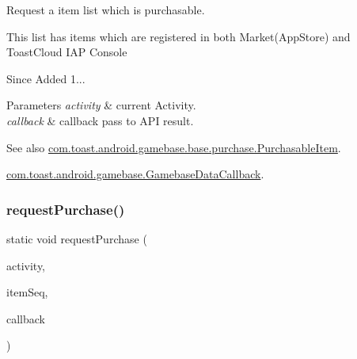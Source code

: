 Request a item list which is purchasable. 

This list has items which are registered in both Market(\+App\+Store) and Toast\+Cloud I\+AP Console

\begin{DoxySince}{Since}
Added 1... 
\end{DoxySince}

\begin{DoxyParams}{Parameters}
{\em activity} & current Activity. \\
\hline
{\em callback} & callback pass to A\+PI result. \\
\hline
\end{DoxyParams}
\begin{DoxySeeAlso}{See also}
\hyperlink{classcom_1_1toast_1_1android_1_1gamebase_1_1base_1_1purchase_1_1_purchasable_item}{com.\+toast.\+android.\+gamebase.\+base.\+purchase.\+Purchasable\+Item}. 

\hyperlink{interfacecom_1_1toast_1_1android_1_1gamebase_1_1_gamebase_data_callback}{com.\+toast.\+android.\+gamebase.\+Gamebase\+Data\+Callback}. 
\end{DoxySeeAlso}
\mbox{\label{classcom_1_1toast_1_1android_1_1gamebase_1_1_gamebase_1_1_purchase_a046768008c4f0d0eb8f6c5052f621b87}} 
\subsubsection{\texorpdfstring{request\+Purchase()}{requestPurchase()}}
{\footnotesize\ttfamily static void request\+Purchase (\begin{DoxyParamCaption}\item[{@Non\+Null final Activity}]{activity,  }\item[{final long}]{item\+Seq,  }\item[{@Non\+Null final \hyperlink{interfacecom_1_1toast_1_1android_1_1gamebase_1_1_gamebase_data_callback}{Gamebase\+Data\+Callback}$<$ \hyperlink{classcom_1_1toast_1_1android_1_1gamebase_1_1base_1_1purchase_1_1_purchasable_receipt}{Purchasable\+Receipt} $>$}]{callback }\end{DoxyParamCaption})\hspace{0.3cm}{\ttfamily [static]}}



